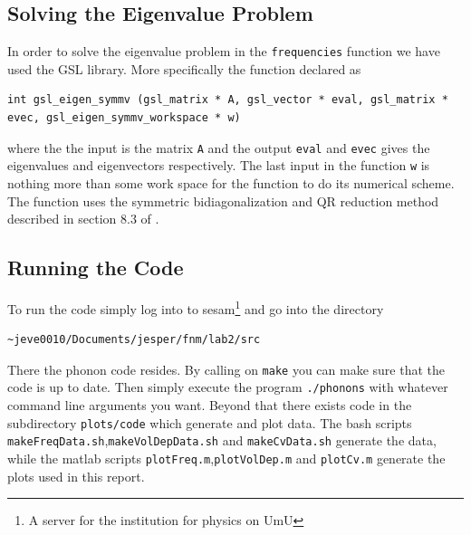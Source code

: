 \documentclass[11pt]{article}
\begin{document}
\subsection{Solving the Eigenvalue Problem}
In order to solve the eigenvalue problem in the \verb+frequencies+ function we have used the GSL library. More specifically the function declared as
\begin{lstlisting}
int gsl_eigen_symmv (gsl_matrix * A, gsl_vector * eval, gsl_matrix * evec, gsl_eigen_symmv_workspace * w)
\end{lstlisting}
where the the input is the matrix \verb+A+ and the output \verb+eval+ and \verb+evec+ gives the eigenvalues and eigenvectors respectively. The last input in the function \verb+w+ is nothing more than some work space for the function to do its numerical scheme. The function uses the symmetric bidiagonalization and QR reduction method described in section 8.3 of \cite{bib:num}.

\subsection{Running the Code}
To run the code simply log into to sesam\footnote{A server for the institution for physics on UmU} and go into the directory
\begin{verbatim}
~jeve0010/Documents/jesper/fnm/lab2/src
\end{verbatim}
There the phonon code resides. By calling on \verb+make+ you can make sure that the code is up to date. Then simply execute the program \verb+./phonons+ with whatever command line arguments you want. Beyond that there exists code in the subdirectory \verb+plots/code+ which generate and plot data. The bash scripts \verb+makeFreqData.sh+,\verb+makeVolDepData.sh+ and \verb+makeCvData.sh+ generate the data, while the matlab scripts \verb+plotFreq.m+,\verb+plotVolDep.m+ and \verb+plotCv.m+ generate the plots used in this report. 

\newpage
\end{document}
